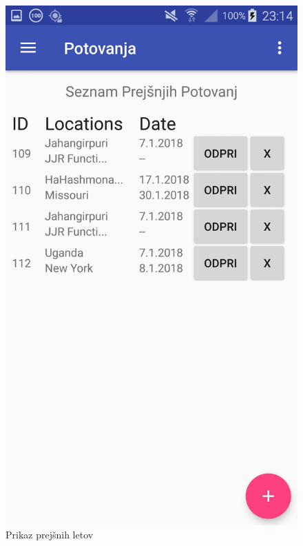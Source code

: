 \documentclass[11pt,a4paper]{article}
\begin{document}
\begin{figure}[htb]
	\centerline{\includegraphics[width=1.0\textwidth]{GUI/potovanja.jpg}}
	\caption{Prikaz prejšnih letov}
	\label{sl:koncept}
\end{figure}
\end{document}
